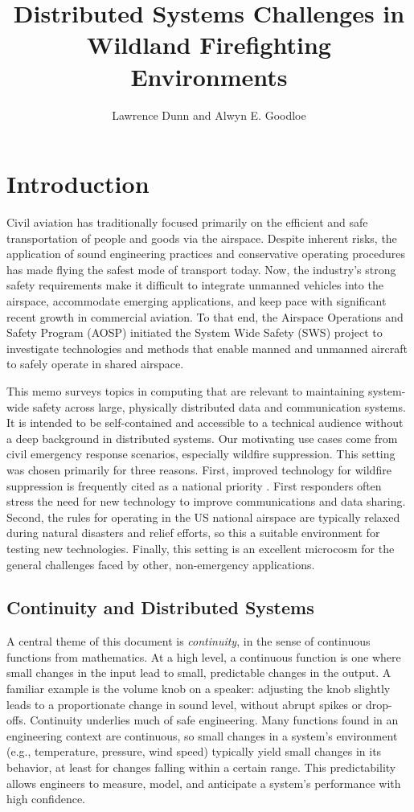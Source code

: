 \documentclass[]             %
{NASA}                       %
\title{Distributed Systems Challenges in Wildland Firefighting Environments}
\author{Lawrence Dunn and Alwyn E. Goodloe}
\theoremstyle{definition}
\begin{document}
\newpage
\setcounter{tocdepth}{2}
\tableofcontents
\newpage

\section{Introduction}\label{sec:introduction}
Civil aviation has traditionally focused primarily on the efficient and safe transportation of people and goods via the airspace. Despite inherent risks, the application of sound engineering practices and conservative operating procedures has made flying the safest mode of transport today. Now, the industry's strong safety requirements make it difficult to integrate unmanned vehicles into the airspace, accommodate emerging applications, and keep pace with significant recent growth in commercial aviation. To that end, the Airspace Operations and Safety Program (AOSP) initiated the System Wide Safety (SWS) project to investigate technologies and methods that enable manned and unmanned aircraft to safely operate in shared airspace.

This memo surveys topics in computing that are relevant to maintaining system-wide safety across large, physically distributed data and communication systems. It is intended to be self-contained and accessible to a technical audience without a deep background in distributed systems. Our motivating use cases come from civil emergency response scenarios, especially wildfire suppression. This setting was chosen primarily for three reasons. First, improved technology for wildfire suppression is frequently cited as a national priority \cite{pcast2023}. First responders often stress the need for new technology to improve communications and data sharing. Second, the rules for operating in the US national airspace are typically relaxed during natural disasters and relief efforts, so this a suitable environment for testing new technologies. Finally, this setting is an excellent microcosm for the general challenges faced by other, non-emergency applications.

\subsection{Continuity and Distributed Systems}
A central theme of this document is \emph{continuity}, in the sense of continuous functions from mathematics. At a high level, a continuous function is one where small changes in the input lead to small, predictable changes in the output. A familiar example is the volume knob on a speaker: adjusting the knob slightly leads to a proportionate change in sound level, without abrupt spikes or drop-offs. Continuity underlies much of safe engineering. Many functions found in an engineering context are continuous, so small changes in a system's environment (e.g., temperature, pressure, wind speed) typically yield small changes in its behavior, at least for changes falling within a certain range. This predictability allows engineers to measure, model, and anticipate a system's performance with high confidence.
\end{document}
